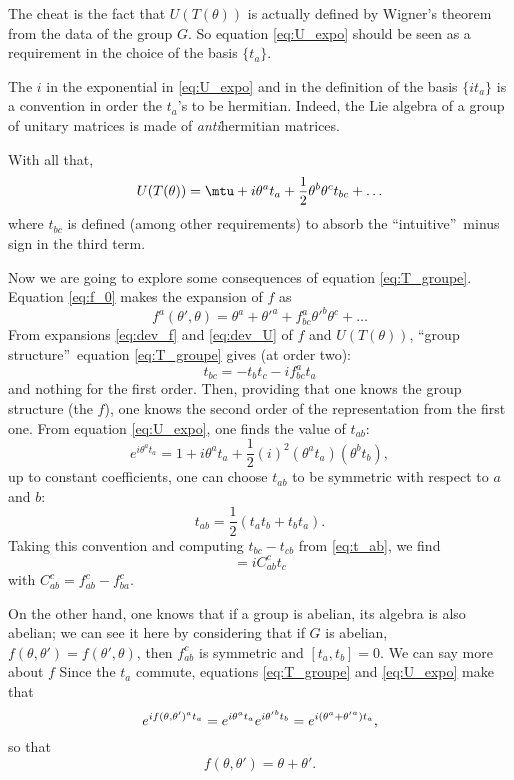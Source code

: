 The cheat is the fact that $U(T(\theta))$ is actually defined by Wigner's theorem from the data of the group $G$. So equation \eqref{eq:U_expo} should be seen as a requirement in the choice of the basis $\{t_a\}$.

\begin{remark}
The $i$ in the exponential in \eqref{eq:U_expo} and in the definition of the basis $\{it_a\}$ is a convention in order the $t_a$'s to be hermitian. Indeed, the Lie algebra of a group of unitary matrices is made of \emph{anti}hermitian matrices.
\end{remark}

With all that,
\begin{equation}\label{eq:dev_U}
   U(T(\theta))=\mtu+i\theta^at_a+\frac{1}{2}\theta^b\theta^ct_{bc}+\ldots
\end{equation}
where $t_{bc}$ is defined (among other requirements) to absorb the ``intuitive''\ minus sign in the third term.

Now we are going to explore some consequences of equation \eqref{eq:T_groupe}. Equation \eqref{eq:f_0} makes the expansion of $f$ as
\begin{equation}\label{eq:dev_f}
f^a(\theta',\theta)=\theta^a+{\theta'}^a+f^a_{bc}{\theta'}^b\theta^c+\ldots
\end{equation}
From expansions \eqref{eq:dev_f} and \eqref{eq:dev_U} of $f$ and $U(T(\theta))$, ``group structure''\ equation \eqref{eq:T_groupe} gives (at order two):
\begin{equation}\label{eq:t_ab}
   t_{bc}=-t_bt_c-if^a_{bc}t_a
\end{equation}
and nothing for the first order. Then, providing that one knows the group structure (the $f$), one knows the second order of the representation from the first one.
From equation \eqref{eq:U_expo}, one finds the value of $t_{ab}$:
\[
   e^{i\theta^at_a}=1+i\theta^at_a+\frac{1}{2}(i)^2(\theta^at_a)(\theta^bt_b),
\]
up to constant coefficients, one can choose $t_{ab}$ to be symmetric with respect to $a$ and $b$:
\[
   t_{ab}=\frac{1}{2}(t_at_b+t_bt_a).
\]
Taking this convention and computing $t_{bc}-t_{cb}$ from \eqref{eq:t_ab}, we find
\begin{equation}
  [t_a,t_b]=iC_{ab}^ct_c
\end{equation}
with $C_{ab}^c=f_{ab}^c-f_{ba}^c$.

On the other hand, one knows that if a group is abelian, its algebra is also abelian; we can see it here by considering that if $G$ is abelian, $f(\theta,\theta')=f(\theta',\theta)$, then $f_{ab}^c$ is symmetric and $[t_a,t_b]=0$. We can say more about $f$ Since the $t_a$ commute, equations \eqref{eq:T_groupe} and \eqref{eq:U_expo} make that
\begin{equation}
  e^{if(\theta,\theta')^at_a}=e^{i\theta^at_a}e^{i{\theta'}^bt_b}\\
                             =e^{i(\theta^a+{\theta'}^a)t_a},
\end{equation}
so that 
\[
   f(\theta,\theta')=\theta+\theta'.
\]

